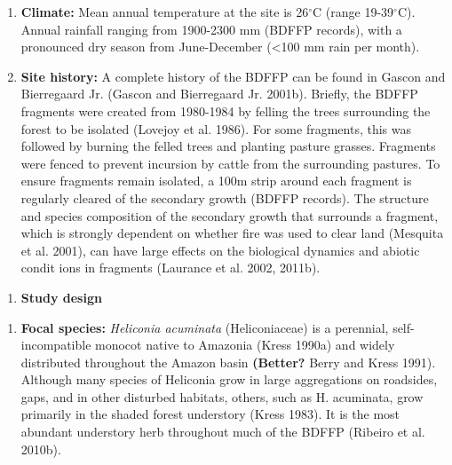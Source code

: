 \documentclass[
  english,
  man]{apa6}
\providecommand{\tightlist}{%
  \setlength{\itemsep}{0pt}\setlength{\parskip}{0pt}}
\begin{document}
\begin{enumerate}
\def\labelenumi{\alph{enumi}.}
\setcounter{enumi}{1}
\item
  \textbf{Climate:} Mean annual temperature at the site is 26\(^\circ\)C
  (range 19-39\(^\circ\)C). Annual rainfall ranging from 1900-2300 mm
  (BDFFP records), with a pronounced dry season from June-December
  (\textless100 mm rain per month).
\item
  \textbf{Site history:} A complete history of the BDFFP can be found in
  Gascon and Bierregaard Jr. (Gascon and Bierregaard Jr. 2001b). Briefly, the BDFFP
  fragments were created from 1980-1984 by felling the trees
  surrounding the forest to be isolated (Lovejoy et al. 1986). For some
  fragments, this was followed by burning the felled trees and
  planting pasture grasses. Fragments were fenced to prevent incursion
  by cattle from the surrounding pastures. To ensure fragments remain
  isolated, a 100m strip around each fragment is regularly cleared of
  the secondary growth (BDFFP records). The structure and species
  composition of the secondary growth that surrounds a fragment, which
  is strongly dependent on whether fire was used to clear land
  (Mesquita et al. 2001), can have large effects on the biological dynamics
  and abiotic condit ions in fragments (Laurance et al. 2002, 2011b).
\end{enumerate}

\begin{enumerate}
\def\labelenumi{\arabic{enumi}.}
\setcounter{enumi}{1}
\tightlist
\item
  \textbf{Study design}
\end{enumerate}

\begin{enumerate}
\def\labelenumi{\alph{enumi}.}
\tightlist
\item
  \textbf{Focal species:} \emph{Heliconia acuminata} (Heliconiaceae) is a
  perennial, self-incompatible monocot native to Amazonia (Kress 1990a)
  and widely distributed throughout the Amazon basin \textbf{(Better?}
  Berry and Kress 1991). Although many species of Heliconia grow in
  large aggregations on roadsides, gaps, and in other disturbed
  habitats, others, such as H. acuminata, grow primarily in the shaded
  forest understory (Kress 1983). It is the most abundant understory
  herb throughout much of the BDFFP (Ribeiro et al. 2010b).
\end{enumerate}
\end{document}
